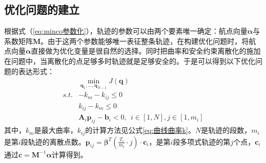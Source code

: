 \documentclass[master,academic]{ysuthesis} %
\begin{document}
		\subsection{优化问题的建立}
		根据式（\ref{eq:minco参数化}），轨迹的参数可以由两个要素唯一确定：航点向量$\bm{\alpha}$与系数矩阵$\bm{M}$。由于这两个参数能够唯一表征整条轨迹，在构建优化问题时，将航点向量$\bm{\alpha}$直接做为优化变量是很自然的选择。同时把曲率和安全约束离散化的施加在问题中，当离散化的点足够多时轨迹就是足够安全的。于是可以得到以下优化问题的表达形式：
		\begin{equation}
			\begin{aligned}
				&\min_{\bm{q}_1,...,\bm{q}_{N-1}} J( \bm{q} ) \\
				s.t.&-k_{m}-k_{ij}\le 0\\
				&k_{ij}-k_{m}\le 0 \\
				&\bm{A}_i\bm{p}_{ij}-\bm{b}_{i}<0,\ \ i\in \left[ 1,N \right] ,j\in \left[ 1,m_i \right] 
			\end{aligned}
		\end{equation}
		其中，$k_{m}$是最大曲率，$k_{ij}$的计算方法见公式\ref{eq:曲线曲率k}。$N$是轨迹的段数，$m_i$是第$i$段轨迹的离散点数。$\bm{p}_{ij}=\bm{\beta}^T(\frac{T_i}{m_i}\cdot j)\cdot \bm{c}_i$，是第$i$段多项式轨迹的第$j$个点，$\bm{c}_i$通过$\bm{c} = \bm{M}^{-1}\bm{\alpha}$计算得到。
\end{document}
